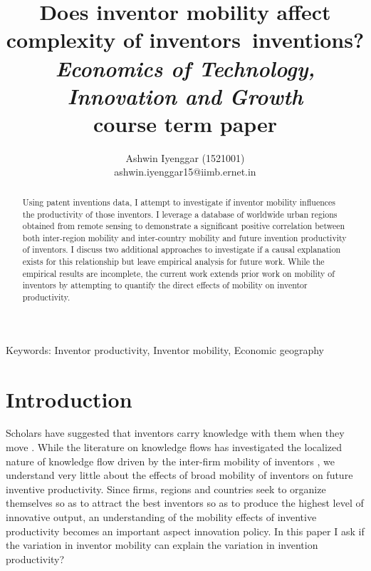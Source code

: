 \documentclass[12pt]{article}
\begin{document}
\title{\LARGE Does inventor mobility affect complexity of inventors\textquotesingle \ inventions?\\ \Large \textit{Economics of Technology, Innovation and Growth} \\course term paper}

\author{Ashwin Iyenggar  (1521001) \\ ashwin.iyenggar15@iimb.ernet.in} 
\large

\maketitle
\thispagestyle{empty}

\begin{abstract}
\large \noindent Using patent inventions data, I attempt to investigate if inventor mobility influences the productivity of those inventors. I leverage a database of worldwide urban regions  obtained from remote sensing to demonstrate a significant positive correlation between both inter-region mobility  and inter-country mobility and future invention productivity of inventors. I discuss two additional approaches to investigate if a causal explanation exists for this relationship but leave empirical analysis for future work. While the empirical results are incomplete, the current work extends prior work on mobility of inventors by attempting to quantify the direct effects of  mobility on inventor productivity.
\end{abstract}
{Keywords:} Inventor productivity, Inventor mobility, Economic geography
\onehalfspacing
\section{Introduction}
Scholars have suggested that inventors carry knowledge with them when they move \citep{Almeida1999}. While the literature on knowledge flows has investigated the localized nature of knowledge flow driven by the inter-firm mobility of inventors \citep{Jaffe1993, Almeida1999, Alcacer2006a}, we understand very little about the effects of broad mobility of inventors on future inventive productivity. Since firms, regions and countries seek to organize themselves so as to attract the best inventors so as to produce the highest level of innovative output, an understanding of the mobility effects of inventive productivity becomes an important aspect innovation policy. In this paper I ask if  the variation in inventor mobility can explain the variation in invention productivity?
\end{document}
